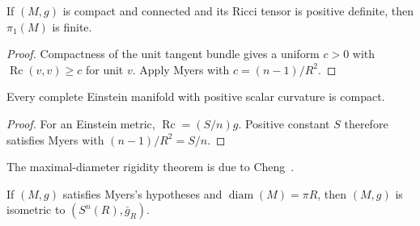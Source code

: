 \begin{corollary}
\label{cor:positive-ricci-finite-fundamental-group}

If $(M,g)$ is compact and connected and its Ricci tensor is positive definite,
then $\pi_1(M)$ is finite.
\end{corollary}

\begin{proof}
\sketch
Compactness of the unit tangent bundle gives a uniform $c>0$ with
$\operatorname{Rc}(v,v)\geq c$ for unit $v$.  Apply Myers with
$c=(n-1)/R^2$.
\end{proof}

\begin{corollary}
\label{cor:einstein-positive-scalar-curvature-compact}
Every complete Einstein manifold with positive scalar curvature is compact.
\end{corollary}

\begin{proof}
\sketch
For an Einstein metric, $\operatorname{Rc}=(S/n)g$.  Positive constant $S$
therefore satisfies Myers with $(n-1)/R^2=S/n$.
\end{proof}

The maximal-diameter rigidity theorem is due to Cheng~\cite{Che75}.

\begin{theorem}
\label{thm:chengs-maximal-diameter}

If $(M,g)$ satisfies Myers's hypotheses and
$\operatorname{diam}(M)=\pi R$, then $(M,g)$ is isometric to
$(S^n(R),\bar g_R)$.
\end{theorem}

